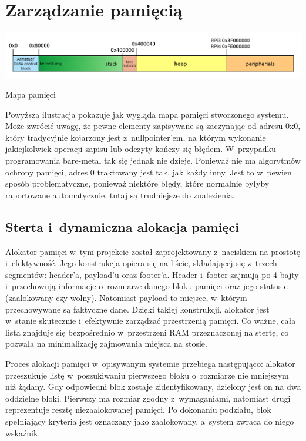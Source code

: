 \documentclass[shortabstract]{iithesis}
\begin{document}
\section{Zarządzanie pamięcią}
\begingroup
\centering
\includegraphics[width=\textwidth]{memorymap.png}
\captionsetup{type=figure}
\caption{Mapa pamięci}
\endgroup
Powyższa ilustracja pokazuje jak wygląda mapa pamięci stworzonego systemu. Może zwrócić uwagę, że pewne elementy zapisywane są zaczynając od adresu 0x0, który tradycyjnie kojarzony jest z~nullpointer'em, na którym wykonanie jakiejkolwiek operacji zapisu lub odczyty kończy się błędem. W~przypadku programowania bare-metal tak się jednak nie dzieje. Ponieważ nie ma algorytmów ochrony pamięci, adres 0 traktowany jest tak, jak każdy inny. Jest to w~pewien sposób problematyczne, ponieważ niektóre błędy, które normalnie byłyby raportowane automatycznie, tutaj są trudniejsze do znalezienia.
\subsection{Sterta i~dynamiczna alokacja pamięci}
Alokator pamięci w~tym projekcie został zaprojektowany z~naciskiem na prostotę i~efektywność. Jego konstrukcja opiera się na liście, składającej się z~trzech segmentów: header'a, payload'u oraz footer'a. Header i~footer zajmują po 4 bajty i~przechowują informacje o~rozmiarze danego bloku pamięci oraz jego statusie (zaalokowany czy wolny). Natomiast payload to miejsce, w~którym przechowywane są faktyczne dane. Dzięki takiej konstrukcji, alokator jest w~stanie skutecznie i~efektywnie zarządzać przestrzenią pamięci. Co ważne, cała lista znajduje się bezpośrednio w~przestrzeni RAM przeznaczonej na stertę, co pozwala na minimalizację zajmowania miejsca na stosie. 

Proces alokacji pamięci w~opisywanym systemie przebiega następująco: alokator przeszukuje listę w~poszukiwaniu pierwszego bloku o~rozmiarze nie mniejszym niż żądany. Gdy odpowiedni blok zostaje zidentyfikowany, dzielony jest on na dwa oddzielne bloki. Pierwszy ma rozmiar zgodny z~wymaganiami, natomiast drugi reprezentuje resztę niezaalokowanej pamięci. Po dokonaniu podziału, blok spełniający kryteria jest oznaczany jako zaalokowany, a~system zwraca do niego wskaźnik.
\end{document}

